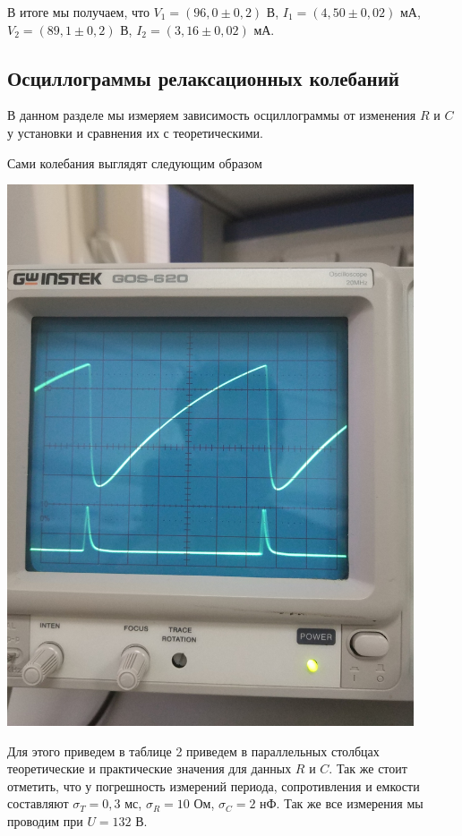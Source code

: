 \documentclass[a4paper, 12pt]{article}%
\begin{document}
В итоге мы получаем, что $V_1 = (96,0 \pm 0,2)$ В, $I_1 = (4,50 \pm 0,02)$ мА, $V_2 = (89,1 \pm 0,2)$ В, $I_2 = (3,16 \pm 0,02)$ мА.
\newpage
\subsection*{Осциллограммы релаксационных колебаний}
В данном разделе мы измеряем зависимость осциллограммы от изменения $R$ и $C$ у установки и сравнения их с теоретическими. 

Сами колебания выглядят следующим образом
\begin{center}
\includegraphics[width = 0.9\textwidth]{7.jpg}
\end{center}

\newpage
Для этого приведем в таблице 2 приведем в параллельных столбцах теоретические и практические значения для данных $R$ и $C$. Так же стоит отметить, что у погрешность измерений периода, сопротивления и емкости составляют $\sigma_T = 0,3$ мс, $\sigma_R = 10$ Ом, $\sigma_C = 2$ нФ. Так же все измерения мы проводим при $U = 132$ В.
\end{document}
